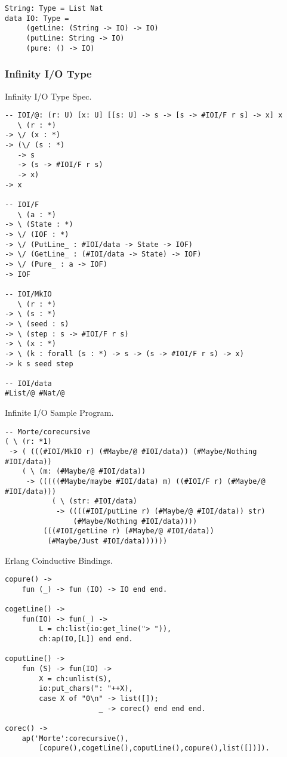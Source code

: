 \documentclass{article}
\begin{document}
\begin{lstlisting}
String: Type = List Nat
data IO: Type =
     (getLine: (String -> IO) -> IO)
     (putLine: String -> IO)
     (pure: () -> IO)
\end{lstlisting}

\subsubsection{Infinity I/O Type}

Infinity I/O Type Spec.

\begin{lstlisting}
-- IOI/@: (r: U) [x: U] [[s: U] -> s -> [s -> #IOI/F r s] -> x] x
   \ (r : *)
-> \/ (x : *)
-> (\/ (s : *)
   -> s
   -> (s -> #IOI/F r s)
   -> x)
-> x

-- IOI/F
   \ (a : *)
-> \ (State : *)
-> \/ (IOF : *)
-> \/ (PutLine_ : #IOI/data -> State -> IOF)
-> \/ (GetLine_ : (#IOI/data -> State) -> IOF)
-> \/ (Pure_ : a -> IOF)
-> IOF

-- IOI/MkIO
   \ (r : *)
-> \ (s : *)
-> \ (seed : s)
-> \ (step : s -> #IOI/F r s)
-> \ (x : *)
-> \ (k : forall (s : *) -> s -> (s -> #IOI/F r s) -> x)
-> k s seed step

-- IOI/data
#List/@ #Nat/@
\end{lstlisting}

Infinite I/O Sample Program.

\begin{lstlisting}[mathescape=true]
-- Morte/corecursive
( \ (r: *1)
 -> ( (((#IOI/MkIO r) (#Maybe/@ #IOI/data)) (#Maybe/Nothing #IOI/data))
    ( \ (m: (#Maybe/@ #IOI/data))
     -> (((((#Maybe/maybe #IOI/data) m) ((#IOI/F r) (#Maybe/@ #IOI/data)))
           ( \ (str: #IOI/data)
            -> ((((#IOI/putLine r) (#Maybe/@ #IOI/data)) str)
                (#Maybe/Nothing #IOI/data))))
         (((#IOI/getLine r) (#Maybe/@ #IOI/data))
          (#Maybe/Just #IOI/data))))))
\end{lstlisting}

Erlang Coinductive Bindings.

\begin{lstlisting}[mathescape=true]
copure() ->
    fun (_) -> fun (IO) -> IO end end.

cogetLine() ->
    fun(IO) -> fun(_) ->
        L = ch:list(io:get_line("> ")),
        ch:ap(IO,[L]) end end.

coputLine() ->
    fun (S) -> fun(IO) ->
        X = ch:unlist(S),
        io:put_chars(": "++X),
        case X of "0\n" -> list([]);
                      _ -> corec() end end end.

corec() ->
    ap('Morte':corecursive(),
        [copure(),cogetLine(),coputLine(),copure(),list([])]).
\end{lstlisting}
\end{document}
